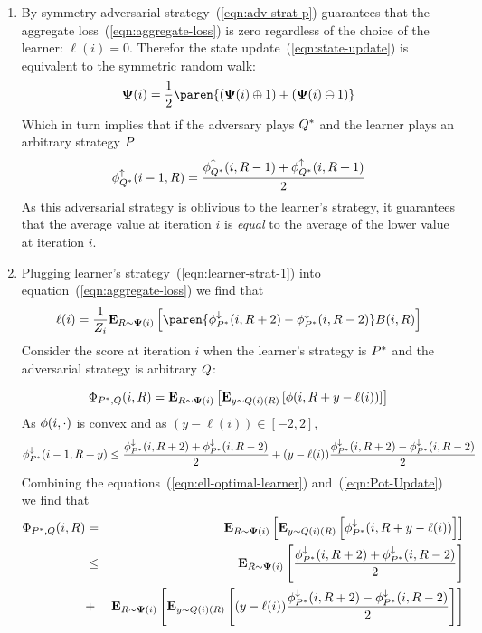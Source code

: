 \documentclass{article}[12pt]
\begin{document}
\proof
\begin{enumerate}
\item By symmetry adversarial strategy~(\ref{eqn:adv-strat-p}) guarantees that
  the aggregate loss~(\ref{eqn:aggregate-loss}) is zero regardless of
  the choice of the learner: $\ell(i)=0$.
  Therefor the state update~(\ref{eqn:state-update}) is equivalent to
  the symmetric random walk:
  $$\state(i) = \frac{1}{2} \paren{(\state(i) \oplus 1) + (\state(i)
    \ominus 1)}$$
  Which in turn implies that if the adversary plays $Q^*$
  and the learner plays an arbitrary strategy $P$
  \begin{equation} \label{eqn:lower}
    \phi_{Q^*}^{\uparrow}(i-1,R) = \frac{\phi_{Q^*}^{\uparrow}(i,R-1)+\phi_{Q^*}^{\uparrow}(i,R+1)}{2}
  \end{equation}
  As this adversarial strategy is oblivious to the learner's strategy, it
  guarantees that the average value at iteration $i$ is {\em equal} to the
  average of the lower value at iteration $i$.
\item
  Plugging learner's strategy~(\ref{eqn:learner-strat-1})
  into equation~(\ref{eqn:aggregate-loss}) we find that
 \begin{equation} \label{eqn:ell-optimal-learner}
   \ell(i) = \frac{1}{Z_{i}} \E{\R \sim \state(i)}{\paren{\upperpotb(i,\R+2)-\upperpotb(i,\R-2)}
   \Bias(i,\R)}
\end{equation}
  Consider the score at iteration $i$ when the learner's strategy
  is $P^*$ and the adversarial strategy is arbitrary $Q$:
  
   \begin{equation} \label{eqn:Pot-Update}
    \Phi_{P^*,Q}(i,R) = {\bf E}_{R \sim {\bf \Psi}(i)}\left[  {\bf E}_{y \sim
      Q(i)(R)}\left[ \phi(i,R+y-\ell(i)) \right] \right]
  \end{equation}
  As $\phi(i,\cdot)$ is convex and as $(y-\ell(i)) \in [-2,2]$,
  \begin{equation} \label{eqn:pot-upper}
    \phi_{P^*}^{\downarrow}(i-1,R+y) \leq \frac{\phi_{P^*}^{\downarrow}(i,R+2)+\phi_{P^*}^{\downarrow}(i,R-2)}{2} +
    (y-\ell(i)) \frac{\phi_{P^*}^{\downarrow}(i,R+2)-\phi_{P^*}^{\downarrow}(i,R-2)}{2}
    \end{equation}
  Combining the equations~(\ref{eqn:ell-optimal-learner}) and~(\ref{eqn:Pot-Update}) we find that
  \begin{eqnarray}
  \Phi_{P^*,Q}(i,R)&=&{\bf E}_{R \sim {\bf \Psi}(i)}\left[ {\bf E}_{y \sim Q(i)(R)}\left[ \phi_{P^*}^{\downarrow}(i,R+y-\ell(i)) \right] \right]\\
  &\leq & {\bf E}_{R \sim {\bf \Psi}(i)}\left[ \frac{\phi_{P^*}^{\downarrow}(i,R+2)+\phi_{P^*}^{\downarrow}(i,R-2)}{2} \right]\\
  &+&
  {\bf E}_{R \sim {\bf \Psi}(i)}\left[ {\bf E}_{y \sim Q(i)(R)}\left[ (y-\ell(i)) \frac{\phi_{P^*}^{\downarrow}(i,R+2)-\phi_{P^*}^{\downarrow}(i,R-2)}{2} \right] \right] \label{eqn:zero-term}
  \end{eqnarray}
  

\end{enumerate}
\end{document}

